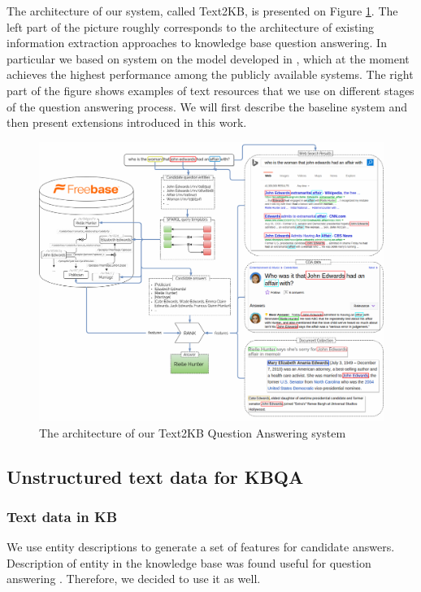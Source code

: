 
The architecture of our system, called Text2KB, is presented on Figure \ref{fig:model}. 
The left part of the picture roughly corresponds to the architecture of existing information extraction approaches to knowledge base question answering.
In particular we based on system on the model developed in \cite{ACCU:2015}, which at the moment achieves the highest performance among the publicly available systems.
The right part of the figure shows examples of text resources that we use on different stages of the question answering process.
We will first describe the baseline system and then present extensions introduced in this work.

\begin{figure}[t]
\centering
\includegraphics[width=\textwidth]{img/Text2KB_model}
\caption{The architecture of our Text2KB Question Answering system}
\label{fig:model}
\end{figure}

\subsection{Unstructured text data for KBQA}

\subsubsection{Text data in KB}
We use entity descriptions to generate a set of features for candidate answers.
Description of entity in the knowledge base was found useful for question answering \cite{Sun:2015:ODQ:2736277.2741651}.
Therefore, we decided to use it as well.

